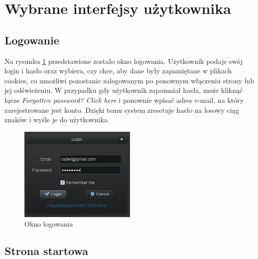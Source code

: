 
\section{Wybrane interfejsy użytkownika}
\label{sec:interfejsy}

\subsection{Logowanie}
\label{sec:login}
Na rysunku \ref{fig:login} przedstawione zostało okno logowania. Użytkownik podaje swój login i hasło oraz wybiera, czy chce, aby dane były zapamiętane w plikach cookies, co umożliwi pozostanie zalogowanym po ponownym włączeniu strony lub jej odświeżeniu. W przypadku gdy użytkownik zapomniał hasła, może kliknąć łącze \emph{Forgotten password? Click here} i ponownie wpisać adres e-mail, na który zarejestrowane jest konto. Dzięki temu system zresetuje hasło na losowy ciąg znaków i wyśle je do użytkownika.
\clearpage

\begin{figure}[h!]
\centering
\includegraphics[width=0.5\textwidth]{./img/interfejsy/login2}
\caption{Okno logowania}
\label{fig:login}
\end{figure}



\subsection{Strona startowa}
\label{sec:start_page}

